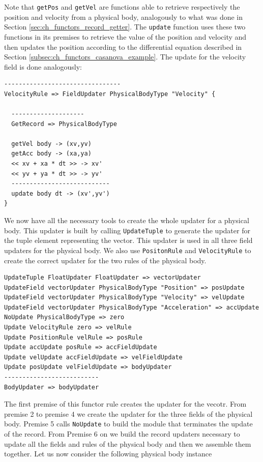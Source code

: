 \noindent
Note that \texttt{getPos} and \texttt{getVel} are functions able to retrieve respectively the position and velocity from a physical body, analogously to what was done in Section \ref{sec:ch_functors_record_getter}. The \texttt{update} function uses these two functions in its premises to retrieve the value of the position and velocity and then updates the position according to the differential equation described in Section \ref{subsec:ch_functors_casanova_example}. The update for the velocity field is done analogously:

\begin{lstlisting}
--------------------------------
VelocityRule => FieldUpdater PhysicalBodyType "Velocity" {

  --------------------
  GetRecord => PhysicalBodyType

  getVel body -> (xv,yv)
  getAcc body -> (xa,ya)
  << xv + xa * dt >> -> xv'
  << yv + ya * dt >> -> yv'
  ---------------------------
  update body dt -> (xv',yv')
}
\end{lstlisting}

\noindent
We now have all the necessary tools to create the whole updater for a physical body. This updater is built by calling \texttt{UpdateTuple} to generate the updater for the tuple element representing the vector. This updater is used in all three field updaters for the physical body. We also use \texttt{PositonRule} and \texttt{VelocityRule} to create the correct updater for the two rules of the physical body.

\begin{lstlisting}
UpdateTuple FloatUpdater FloatUpdater => vectorUpdater
UpdateField vectorUpdater PhysicalBodyType "Position" => posUpdate  
UpdateField vectorUpdater PhysicalBodyType "Velocity" => velUpdate  
UpdateField vectorUpdater PhysicalBodyType "Acceleration" => accUpdate
NoUpdate PhysicalBodyType => zero
Update VelocityRule zero => velRule
Update PositionRule velRule => posRule
Update accUpdate posRule => accFieldUpdate
Update velUpdate accFieldUpdate => velFieldUpdate
Update posUpdate velFieldUpdate => bodyUpdater
--------------------------
BodyUpdater => bodyUpdater
\end{lstlisting}

\noindent
The first premise of this functor rule creates the updater for the vecotr. From premise 2 to premise 4 we create the updater for the three fields of the physical body. Premise 5 calls \texttt{NoUpdate} to build the module that terminates the update of the record. From Premise 6 on we build the record updaters necessary to update all the fields and rules of the physical body and then we assemble them together.
Let us now consider the following physical body instance

